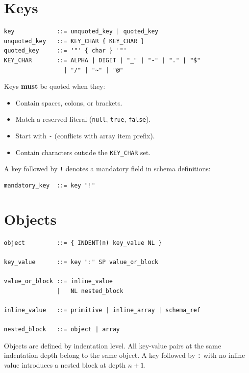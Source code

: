 \documentclass[11pt, a4paper]{article}
\begin{document}
\section{Keys}
\label{sec:keys}

\begin{lstlisting}[style=ebnf]
key            ::= unquoted_key | quoted_key
unquoted_key   ::= KEY_CHAR { KEY_CHAR }
quoted_key     ::= '"' { char } '"'
KEY_CHAR       ::= ALPHA | DIGIT | "_" | "-" | "." | "$"
                 | "/" | "~" | "@"
\end{lstlisting}

\noindent Keys \textbf{must} be quoted when they:
\begin{itemize}
\item Contain spaces, colons, or brackets.
\item Match a reserved literal (\texttt{null}, \texttt{true}, \texttt{false}).
\item Start with \texttt{-} (conflicts with array item prefix).
\item Contain characters outside the \texttt{KEY\_CHAR} set.
\end{itemize}

\noindent A key followed by \texttt{!} denotes a mandatory field in schema definitions:

\begin{lstlisting}[style=ebnf]
mandatory_key  ::= key "!"
\end{lstlisting}

\section{Objects}
\label{sec:objects}

\begin{lstlisting}[style=ebnf]
object         ::= { INDENT(n) key_value NL }

key_value      ::= key ":" SP value_or_block

value_or_block ::= inline_value
               |   NL nested_block

inline_value   ::= primitive | inline_array | schema_ref

nested_block   ::= object | array
\end{lstlisting}

\noindent Objects are defined by indentation level. All key-value pairs at the same
indentation depth belong to the same object. A key followed by \texttt{:} with no
inline value introduces a nested block at depth $n+1$.
\end{document}
